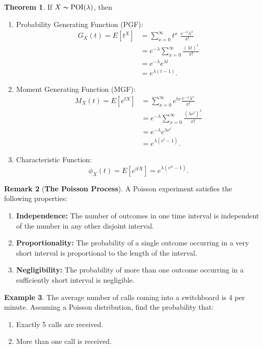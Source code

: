 \documentclass[12pt,a4paper]{report}
\theoremstyle{definition}
\newtheorem{thm}{Theorem}[section]
\newtheorem{example}[thm]{Example}
\newtheorem{remark}[thm]{Remark}
\theoremstyle{plain}
\theoremstyle{definition}
\begin{document}
 


\begin{thm}
If $X\thicksim \operatorname{POI}(\lambda)$, then 
\begin{enumerate}
\item Probability Generating Function (PGF):
\begin{align*}
G_X(t) = E[t^X] & = \sum_{x=0}^{\infty} t^x\,\, \frac{e^{-\lambda} \lambda^x}{x!}\\
& = e^{-\lambda} \sum_{x=0}^{\infty} \frac{(\lambda t)^x}{x!}\\
& = e^{-\lambda} e^{\lambda t}\\
& = e^{\lambda(t-1)}. 
\end{align*}


\item Moment Generating Function (MGF):
\begin{align*}
M_X(t) = E[e^{tX}] & = \sum_{x=0}^{\infty} e^{tx} \frac{e^{-\lambda} \lambda^x}{x!}\\
&  = e^{-\lambda} \sum_{x=0}^{\infty} \frac{(\lambda e^t)^x}{x!}\\
& = e^{-\lambda} e^{\lambda e^t}\\
& = e^{\lambda(e^t-1)}.
\end{align*}

\item Characteristic Function:
\[ \phi_X(t) = E[e^{itX}] = e^{\lambda(e^{it}-1)}. \]
\end{enumerate}
\end{thm}




\begin{remark}[{\textbf{The Poisson Process}}] A Poisson experiment satisfies the following properties: 
\begin{enumerate} 
\item[(i)] \textbf{Independence:} The number of outcomes in one time interval is independent of the number in any other disjoint interval. 
\item[(ii)] \textbf{Proportionality:} The probability of a single outcome occurring in a very short interval is proportional to the length of the interval. 
\item[(iii)] \textbf{Negligibility:} The probability of more than one outcome occurring in a sufficiently short interval is negligible. 
\end{enumerate} 
\end{remark}

\begin{example} The average number of calls coming into a switchboard is 4 per minute. Assuming a Poisson distribution, find the probability that: 
\begin{enumerate} 
\item[(i)] Exactly 5 calls are received. 
\item[(ii)] More than one call is received. 
\end{enumerate} 
\end{example}
\end{document}
